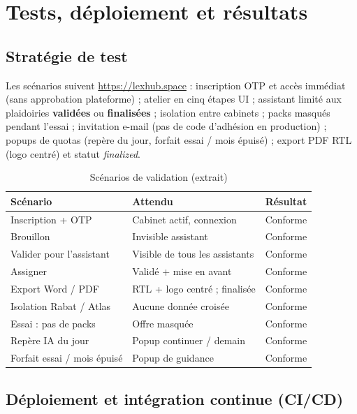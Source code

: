\chapter{Tests, déploiement et résultats}
\label{ch:tests}

\section{Stratégie de test}

Les scénarios suivent \url{https://lexhub.space} : inscription OTP et accès immédiat (sans approbation plateforme) ; atelier en cinq étapes UI ; assistant limité aux plaidoiries \textbf{validées} ou \textbf{finalisées} ; isolation entre cabinets ; packs masqués pendant l'essai ; invitation e-mail (pas de code d'adhésion en production) ; popups de quotas (repère du jour, forfait essai / mois épuisé) ; export PDF RTL (logo centré) et statut \textit{finalized}.

\begin{table}[H]
\centering
\caption{Scénarios de validation (extrait)}
\label{tab:scenarios}
\small
\renewcommand{\arraystretch}{1.2}
\begin{tabular}{@{}p{3.6cm}p{5.2cm}p{3.6cm}@{}}
\toprule
\textbf{Scénario} & \textbf{Attendu} & \textbf{Résultat} \\
\midrule
Inscription + OTP & Cabinet actif, connexion & Conforme \\
Brouillon & Invisible assistant & Conforme \\
Valider pour l'assistant & Visible de tous les assistants & Conforme \\
Assigner & Validé + mise en avant & Conforme \\
Export Word / PDF & RTL + logo centré ; finalisée & Conforme \\
Isolation Rabat / Atlas & Aucune donnée croisée & Conforme \\
Essai : pas de packs & Offre masquée & Conforme \\
Repère IA du jour & Popup continuer / demain & Conforme \\
Forfait essai / mois épuisé & Popup de guidance & Conforme \\
\bottomrule
\end{tabular}
\end{table}

\section{Déploiement et intégration continue (CI/CD)}
\label{sec:cicd}

